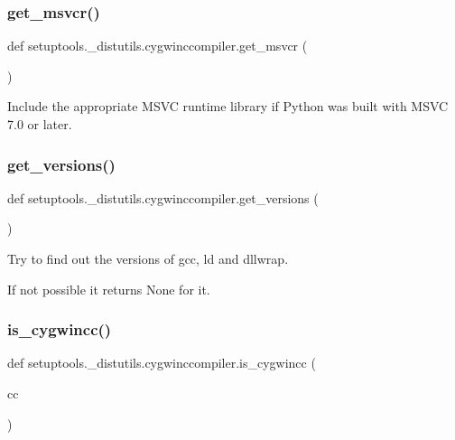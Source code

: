 \subsubsection{\texorpdfstring{get\+\_\+msvcr()}{get\_msvcr()}}
{\footnotesize\ttfamily def setuptools.\+\_\+distutils.\+cygwinccompiler.\+get\+\_\+msvcr (\begin{DoxyParamCaption}{ }\end{DoxyParamCaption})}

\begin{DoxyVerb}Include the appropriate MSVC runtime library if Python was built
with MSVC 7.0 or later.
\end{DoxyVerb}
 \mbox{\label{namespacesetuptools_1_1__distutils_1_1cygwinccompiler_a5a4e7c943f142f32d3769f62fdbae571}} 
\subsubsection{\texorpdfstring{get\+\_\+versions()}{get\_versions()}}
{\footnotesize\ttfamily def setuptools.\+\_\+distutils.\+cygwinccompiler.\+get\+\_\+versions (\begin{DoxyParamCaption}{ }\end{DoxyParamCaption})}

\begin{DoxyVerb}Try to find out the versions of gcc, ld and dllwrap.

If not possible it returns None for it.
\end{DoxyVerb}
 \mbox{\label{namespacesetuptools_1_1__distutils_1_1cygwinccompiler_aed4f1da3f7e9fe2673157d75fcd63bc3}} 
\subsubsection{\texorpdfstring{is\+\_\+cygwincc()}{is\_cygwincc()}}
{\footnotesize\ttfamily def setuptools.\+\_\+distutils.\+cygwinccompiler.\+is\+\_\+cygwincc (\begin{DoxyParamCaption}\item[{}]{cc }\end{DoxyParamCaption})}

